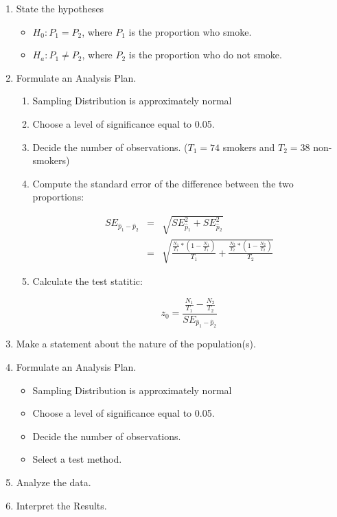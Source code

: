 \documentclass[11pt, chapterprefix=true]{scrbook}\usepackage[]{graphicx}\usepackage[]{color}
\begin{document}
\begin{enumerate}
\item State the hypotheses

  \begin{itemize}
  \item $H_0: P_1 = P_2$,   where $P_1$ is the proportion who smoke.
  \item $H_a: P_1 \ne P_2$, where $P_2$ is the proportion who do not smoke.
  \end{itemize}
  
\item Formulate an Analysis Plan. 

  \begin{enumerate}
  \item Sampling Distribution is approximately normal
  \item Choose a level of significance equal to 0.05.
  \item Decide the number of observations. ($T_1 = 74$ smokers and $T_2 = 38$ non-smokers)
  \item Compute the standard error of the difference between the two proportions:
  
  \begin{eqnarray*}
    SE_{\hat{p}_1-\hat{p}_2} &=& \sqrt{SE_{\hat{p}_1}^2 + SE_{\hat{p}_2}^2} \\
             &=& \sqrt{ \frac{\frac{N_1}{T_1} *(1 - \frac{N_1}{T_1})}{T_1} + \frac{\frac{N_2}{T_2} *(1 - \frac{N_2}{T_2})}{T_2} }
  \end{eqnarray*}
    
  \item Calculate the test statitic:
  
    \begin{equation*}
    z_0 = \frac{\frac{N_1}{T_1} - \frac{N_2}{T_2}}{SE_{\hat{p}_1-\hat{p}_2}}
    \end{equation*}

  \end{enumerate}  


\item Make a statement about the nature of the population(s).
\item Formulate an Analysis Plan. 

  \begin{itemize}
  \item Sampling Distribution is approximately normal
  \item Choose a level of significance equal to 0.05.
  \item Decide the number of observations.
  \item Select a test method.
  \end{itemize}

\item Analyze the data.
\item Interpret the Results.
\end{enumerate}
\end{document}
